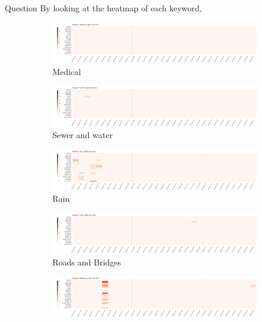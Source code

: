 \documentclass{article}
\begin{document}
\begin{section}{Question}
By looking at the heatmap of each keyword, 

\begin{figure}[!h]
    \centering
    \begin{subfigure}[!h]{0.48\textwidth}
        \centering
        \includegraphics[width=1.00\textwidth]{figs/cond_30h/cond_30h_medical.png}
        \caption{Medical}
    \end{subfigure}
    \begin{subfigure}[!h]{0.48\textwidth}
        \centering
        \includegraphics[width=1.00\textwidth]{figs/cond_30h/cond_30h_sewer.png}
        \caption{Sewer and water}
    \end{subfigure}
    \begin{subfigure}[!h]{0.48\textwidth}
        \centering
        \includegraphics[width=1.00\textwidth]{figs/cond_30h/cond_30h_rain.png}
        \caption{Rain}
    \end{subfigure}
    \begin{subfigure}[!h]{0.48\textwidth}
        \centering
        \includegraphics[width=1.00\textwidth]{figs/cond_30h/cond_30h_road.png}
        \caption{Roads and Bridges}
    \end{subfigure}
    \begin{subfigure}[!h]{0.48\textwidth}
        \centering
        \includegraphics[width=1.00\textwidth]{figs/cond_30h/cond_30h_build.png}

\end{subfigure}
\end{figure}
\end{section}
\end{document}
